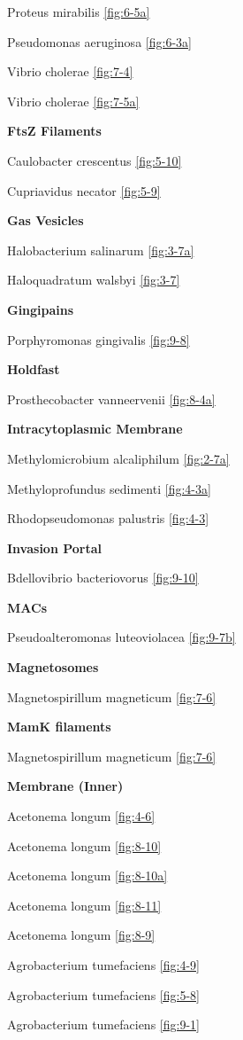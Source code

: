 \documentclass[]{tufte-book}
\begin{document}
Proteus mirabilis \ref{fig:6-5a}

Pseudomonas aeruginosa \ref{fig:6-3a}

Vibrio cholerae \ref{fig:7-4}

Vibrio cholerae \ref{fig:7-5a}

\textbf{FtsZ Filaments}

Caulobacter crescentus \ref{fig:5-10}

Cupriavidus necator \ref{fig:5-9}

\textbf{Gas Vesicles}

Halobacterium salinarum \ref{fig:3-7a}

Haloquadratum walsbyi \ref{fig:3-7}

\textbf{Gingipains}

Porphyromonas gingivalis \ref{fig:9-8}

\textbf{Holdfast}

Prosthecobacter vanneervenii \ref{fig:8-4a}

\textbf{Intracytoplasmic Membrane}

Methylomicrobium alcaliphilum \ref{fig:2-7a}

Methyloprofundus sedimenti \ref{fig:4-3a}

Rhodopseudomonas palustris \ref{fig:4-3}

\textbf{Invasion Portal}

Bdellovibrio bacteriovorus \ref{fig:9-10}

\textbf{MACs}

Pseudoalteromonas luteoviolacea \ref{fig:9-7b}

\textbf{Magnetosomes}

Magnetospirillum magneticum \ref{fig:7-6}

\textbf{MamK filaments}

Magnetospirillum magneticum \ref{fig:7-6}

\textbf{Membrane (Inner)}

Acetonema longum \ref{fig:4-6}

Acetonema longum \ref{fig:8-10}

Acetonema longum \ref{fig:8-10a}

Acetonema longum \ref{fig:8-11}

Acetonema longum \ref{fig:8-9}

Agrobacterium tumefaciens \ref{fig:4-9}

Agrobacterium tumefaciens \ref{fig:5-8}

Agrobacterium tumefaciens \ref{fig:9-1}
\end{document}
